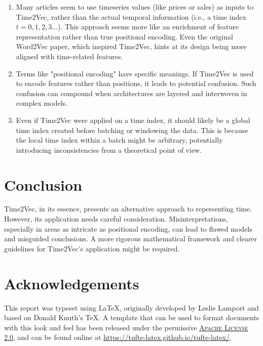 \documentclass{tufte-handout}
\begin{document}
\begin{enumerate}
\item Many articles seem to use timeseries values (like prices or sales) as inputs to Time2Vec, rather than the actual temporal information (i.e., a time index \( t=0,1,2,3...\)). This approach seems more like an enrichment of feature representation rather than true positional encoding. Even the original Word2Vec paper\cite{word2vec}, which inspired Time2Vec, hints at its design being more aligned with time-related features.

\item Terms like "positional encoding" have specific meanings. If Time2Vec is used to encode features rather than positions, it leads to potential confusion. Such confusion can compound when architectures are layered and interwoven in complex models.

\item Even if Time2Vec were applied on a time index, it should likely be a global time index created before batching or windowing the data. This is because the local time index within a batch might be arbitrary, potentially introducing inconsistencies from a theoretical point of view.
\end{enumerate}

\section{Conclusion}

Time2Vec, in its essence, presents an alternative approach to repersenting time. However, its application needs careful consideration. Misinterpretations, especially in areas as intricate as positional encoding, can lead to flawed models and misguided conclusions. A more rigorous mathematical framework and clearer guidelines for Time2Vec's application might be required.


\section{Acknowledgements}\label{sec:support}

This report was typeset using \LaTeX, originally developed by Leslie Lamport and based on Donald Knuth's \TeX. A template that can be used to format documents with this look and feel has been released under the permissive \href{http://www.apache.org/licenses/LICENSE-2.0}{\textsc{Apache License 2.0}}, and can be found online at \url{https://tufte-latex.github.io/tufte-latex/}.



\end{document}
